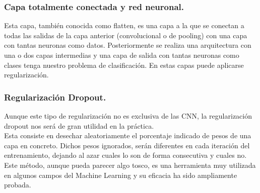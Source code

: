 \documentclass[a4paper,10pt]{article}
\begin{document}
\subsubsection{Capa totalmente conectada y red neuronal.}
Esta capa, también conocida como flatten, es una capa a la que se conectan a todas las salidas de la capa anterior (convolucional o de pooling) con una capa con tantas neuronas como datos. Posteriormente se realiza una arquitectura con una o dos capas intermedias y una capa de salida con tantas neuronas como clases tenga nuestro problema de clasificación. En estas capas puede aplicarse regularización.
\subsubsection{Regularización Dropout.}
Aunque este tipo de regularización no es exclusiva de las CNN, la regularización dropout nos será de gran utilidad en la práctica. \\Esta consiste en desechar aleatoriamente el porcentaje indicado de pesos de una capa en concreto. Dichos pesos ignorados, serán diferentes en cada iteración del entrenamiento, dejando al azar cuales lo son de forma consecutiva y cuales no.\\ Este método, aunque pueda parecer algo tosco, es una herramienta muy utilizada en algunos campos del Machine Learning y su eficacia ha sido ampliamente probada.
\end{document}
